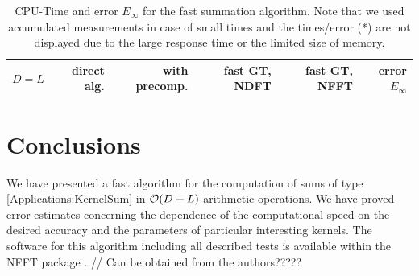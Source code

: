 \documentclass[11pt,a4paper,twoside,bibtotoc]{scrartcl}
\theoremstyle{plain}
\theoremstyle{definition}
\theoremstyle{remark}
\numberwithin{equation}{section}
\numberwithin{table}{section}
\numberwithin{figure}{section}
\begin{document}
\begin{table}[ht!]
  \begin{center}
    \begin{tabular}{r|r|r|r|r|r}
      $D=L$    & direct alg.   & with precomp. & fast GT, NDFT & fast GT, NFFT & error $E_\infty$ \\ \hline
    \end{tabular}
  \end{center}
  \caption{CPU-Time and error $E_{\infty}$ for the fast summation algorithm.
    Note that we used accumulated measurements in case of small times and the
    times/error (*) are not displayed due to the large response time or the 
    limited size of memory.}
  \label{tab:TimeSpace}
\end{table}


\section{Conclusions}

We have presented a fast algorithm for the computation of sums of type
\eqref{Applications:KernelSum} in ${\cal O} (D +L)$ arithmetic operations.
We have proved error estimates concerning the dependence of the computational
speed on the desired accuracy and the parameters of particular interesting
kernels.
The software for this algorithm including all described tests is available
within the NFFT package \cite[{\tt ./example/fastsumS2}]{kupo02C}. // Can be
obtained from the authors?????


%
%
%

\end{document}
